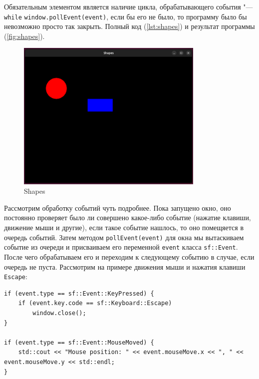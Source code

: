 Обязательным элементом является наличие цикла, обрабатывающего события "--- \texttt{\color{blue}while} \texttt{window.pollEvent(event)}, если бы его не было, то программу было бы невозможно просто так закрыть. Полный код (\autoref{lst:shapes}) и результат программы (\autoref{fig:shapes}).
\begin{figure}[H]
    \centering
    \includegraphics[width=0.8\textwidth]{src/img/sfml_shapes.png}
    \caption{Shapes}
    \label{fig:shapes}
\end{figure}

Рассмотрим обработку событий чуть подробнее. Пока запущено окно, оно постоянно проверяет было ли совершено какое-либо событие (нажатие клавиши, движение мыши и другие), если такое событие нашлось, то оно помещяется в очередь событий. Затем методом \texttt{pollEvent(event)} для окна мы вытаскиваем событие из очереди и присваиваем его переменной \texttt{event} класса \texttt{sf::Event}. После чего обрабатываем его и переходим к  следующему событию в случае, если очередь не пуста. Рассмотрим на примере движения мыши и нажатия клавиши \texttt{Escape}:

\begin{lstlisting}[style=myStyle]
if (event.type == sf::Event::KeyPressed) {
    if (event.key.code == sf::Keyboard::Escape)
        window.close();
}

if (event.type == sf::Event::MouseMoved) {
    std::cout << "Mouse position: " << event.mouseMove.x << ", " << event.mouseMove.y << std::endl;
}
\end{lstlisting}

